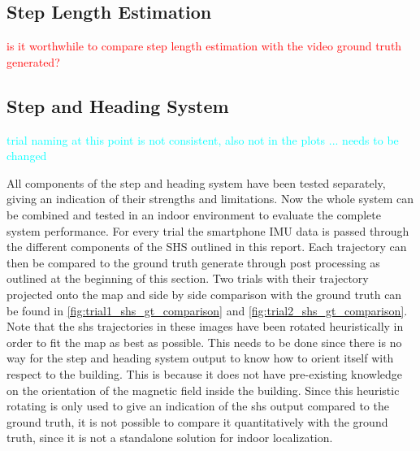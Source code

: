 \subsection{Step Length Estimation}

\textcolor{red}{is it worthwhile to compare step length estimation with the video ground truth generated?}

\subsection{Step and Heading System}

\textcolor{cyan}{trial naming at this point is not consistent, also not in the plots ... needs to be changed}

All components of the step and heading system have been tested separately, giving an indication of their strengths and limitations. Now the whole system can be combined and tested in an indoor environment to evaluate the complete system performance.
For every trial the smartphone IMU data is passed through the different components of the SHS outlined in this report. Each trajectory can then be compared to the ground truth generate through post processing as outlined at the beginning of this section. Two trials with their trajectory projected onto the map and side by side comparison with the ground truth can be found in \cref{fig:trial1_shs_gt_comparison} and \cref{fig:trial2_shs_gt_comparison}. Note that the shs trajectories in these images have been rotated heuristically in order to fit the map as best as possible. This needs to be done since there is no way for the step and heading system output to know how to orient itself with respect to the building. This is because it does not have pre-existing knowledge on the orientation of the magnetic field inside the building. Since this heuristic rotating is only used to give an indication of the shs output compared to the ground truth, it is not possible to compare it quantitatively with the ground truth, since it is not a standalone solution for indoor localization.

